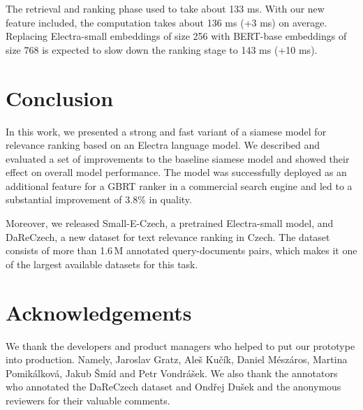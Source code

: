 \documentclass[letterpaper]{article} \usepackage{aaai22 }  \usepackage{times}  \usepackage{helvet}  \usepackage{courier}  \usepackage[hyphens]{url}  \usepackage{graphicx} \usepackage{amsmath,amsfonts,amssymb, mathabx,bm,bbm}
\begin{document}
The retrieval and ranking phase used to take about 133 ms. With our new feature included, the computation takes about 136 ms (+3 ms) on average. Replacing Electra-small embeddings of size 256 with BERT-base embeddings of size 768 is expected to slow down the ranking stage to 143 ms (+10 ms).

\section{Conclusion}\label{sec:conclusion}
In this work, we presented a strong and fast variant of a siamese model for relevance ranking based on an Electra language model. We described and evaluated a set of improvements to the baseline siamese model and showed their effect on overall model performance. The model was successfully deployed as an additional feature for a GBRT ranker in a commercial search engine and led to a substantial improvement of 3.8\% in quality.

Moreover, we released Small-E-Czech, a pretrained Electra-small model, and DaReCzech, a new dataset for text relevance ranking in Czech. The dataset consists of more than 1.6\,M annotated query-documents pairs, which makes it one of the largest available datasets for this task.

\section{Acknowledgements}

We thank the developers and product managers who helped to put our prototype into production. Namely, Jaroslav Gratz, Aleš Kučík, Daniel Mészáros, Martina Pomikálková, Jakub Šmíd and Petr Vondrášek. We also thank the annotators who annotated the DaReCzech dataset and Ondřej Dušek and the anonymous reviewers for their valuable comments.


\footnotesize
\end{document}
